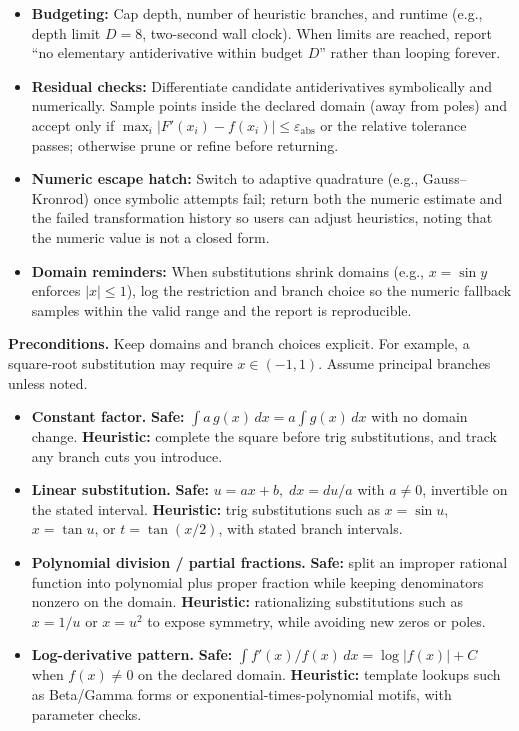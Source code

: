 \begin{tcolorbox}[summarybox, title={Termination policies and numeric fallbacks}]
\begin{itemize}
    \item \textbf{Budgeting:} Cap depth, number of heuristic branches, and runtime (e.g., depth limit \(D=8\), two-second wall clock). When limits are reached, report ``no elementary antiderivative within budget \(D\)'' rather than looping forever.
    \item \textbf{Residual checks:} Differentiate candidate antiderivatives symbolically and numerically. Sample points inside the declared domain (away from poles) and accept only if \( \max_i |F'(x_i) - f(x_i)| \le \varepsilon_{\text{abs}}\) or the relative tolerance passes; otherwise prune or refine before returning.
    \item \textbf{Numeric escape hatch:} Switch to adaptive quadrature (e.g., Gauss--Kronrod) once symbolic attempts fail; return both the numeric estimate and the failed transformation history so users can adjust heuristics, noting that the numeric value is not a closed form.
    \item \textbf{Domain reminders:} When substitutions shrink domains (e.g., \(x=\sin y\) enforces \(|x|\le1\)), log the restriction and branch choice so the numeric fallback samples within the valid range and the report is reproducible.
\end{itemize}
\end{tcolorbox}
\begin{tcolorbox}[summarybox, title={Transformation toolkit (safe vs.\ heuristic)}]
\textbf{Preconditions.} Keep domains and branch choices explicit. For example, a square-root substitution may require \(x\in(-1,1)\). Assume principal branches unless noted.
\begin{itemize}
    \item \textbf{Constant factor.} \textbf{Safe:} \(\int a\, g(x)\, dx = a\int g(x)\, dx\) with no domain change. \textbf{Heuristic:} complete the square before trig substitutions, and track any branch cuts you introduce.
    \item \textbf{Linear substitution.} \textbf{Safe:} \(u=ax+b,\; dx=du/a\) with \(a\neq0\), invertible on the stated interval. \textbf{Heuristic:} trig substitutions such as \(x=\sin u\), \(x=\tan u\), or \(t=\tan(x/2)\), with stated branch intervals.
    \item \textbf{Polynomial division / partial fractions.} \textbf{Safe:} split an improper rational function into polynomial plus proper fraction while keeping denominators nonzero on the domain. \textbf{Heuristic:} rationalizing substitutions such as \(x=1/u\) or \(x=u^2\) to expose symmetry, while avoiding new zeros or poles.
    \item \textbf{Log-derivative pattern.} \textbf{Safe:} \(\int f'(x)/f(x)\, dx = \log|f(x)|+C\) when \(f(x)\neq 0\) on the declared domain. \textbf{Heuristic:} template lookups such as Beta/Gamma forms or exponential-times-polynomial motifs, with parameter checks.
\end{itemize}
\end{tcolorbox}

